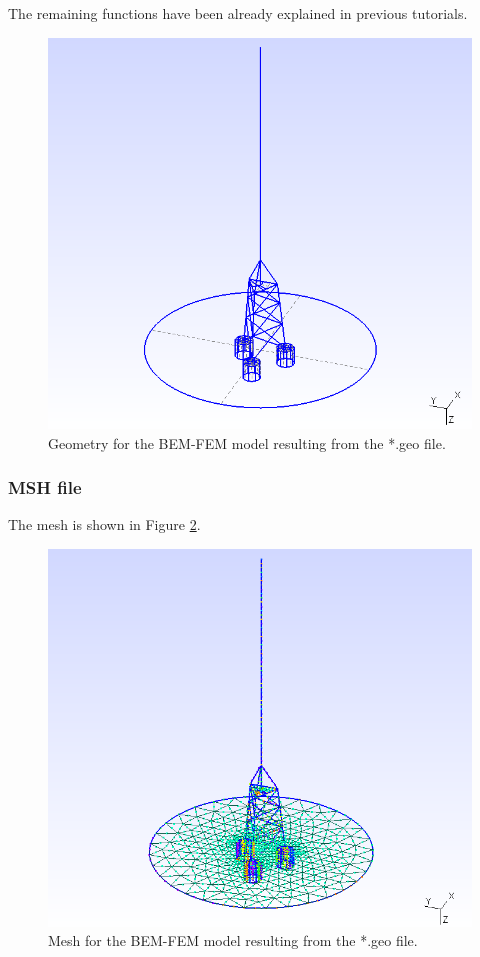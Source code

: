 \documentclass[a4]{article}
\begin{document}
The remaining functions have been already explained in previous tutorials.

\begin{figure}[tbh!]
	\centering
	\includegraphics[scale=0.6]{geo2.png}
	\caption{Geometry for the BEM-FEM model resulting from the *.geo file.}
	\label{fig:geo2}
\end{figure}

\subsubsection{MSH file}

The mesh is shown in Figure \ref{fig:mesh2}.

\begin{figure}[h!]
	\centering
	\includegraphics[scale=0.6]{mesh2.png}
	\caption{Mesh for the BEM-FEM model resulting from the *.geo file.}
	\label{fig:mesh2}
\end{figure}
\end{document}
